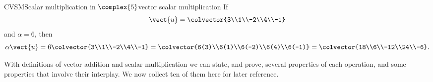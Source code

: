 \begin{example}{CVSM}{Scalar multiplication in $\complex{5}$}{vector scalar multiplication}
If
%
\begin{equation*}
\vect{u}=\colvector{3\\1\\-2\\4\\-1}
\end{equation*}
%
and $\alpha=6$, then
%
\begin{equation*}
\alpha\vect{u}=
6\colvector{3\\1\\-2\\4\\-1}=
\colvector{6(3)\\6(1)\\6(-2)\\6(4)\\6(-1)}=
\colvector{18\\6\\-12\\24\\-6}.
\end{equation*}
%
\end{example}
%
%
%
With definitions of vector addition and scalar multiplication we can state, and prove, several properties of each operation, and some properties that involve their interplay.  We now collect ten of them here for later reference.
%
